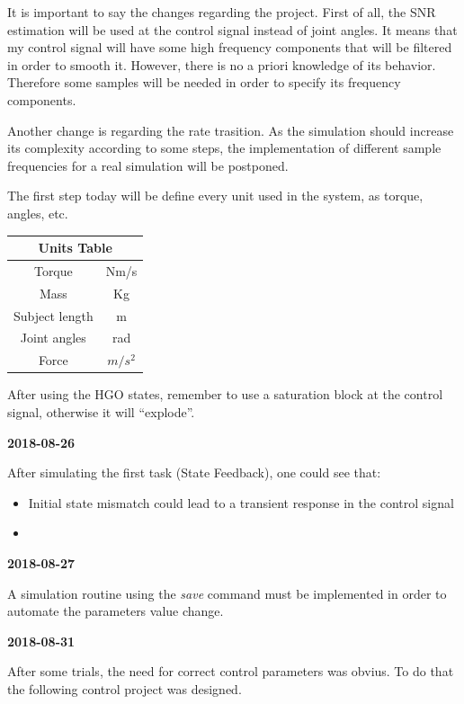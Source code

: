 It is important to say the changes regarding the project. First of all, the SNR estimation will be used at the control signal instead of joint angles. It means that my control signal will have some high frequency components that will be filtered in order to smooth it. However, there is no a priori knowledge of its behavior. Therefore some samples will be needed in order to specify its frequency components.

Another change is regarding the rate trasition. As the simulation should increase its complexity according to some steps, the implementation of different sample frequencies for a real simulation will be postponed.

The first step today will be define every unit used in the system, as torque, angles, etc.

\begin{table}[h]
    \centering
    \begin{tabular}{|c|c|}
    \hline
    \multicolumn{2}{|c|}{Units Table} \\ \hline
    Torque            & Nm/s     \\ \hline
    Mass              & Kg       \\ \hline
    Subject length    & m        \\ \hline
    Joint angles      & rad      \\ \hline
    Force             & $m/s^{2}$\\ \hline
    \end{tabular}
\end{table}

After using the HGO states, remember to use a saturation block at the control signal, otherwise it will ``explode''.

\textbf{2018-08-26}

After simulating the first task (State Feedback), one could see that:
\begin{itemize}
    \item Initial state mismatch could lead to a transient response in the control signal
    \item 
\end{itemize}

\textbf{2018-08-27}

A simulation routine using the \textit{save} command  must be implemented in order to automate the parameters value change.

\textbf{2018-08-31}

After some trials, the need for correct control parameters was obvius. To do that the following control project was designed.

